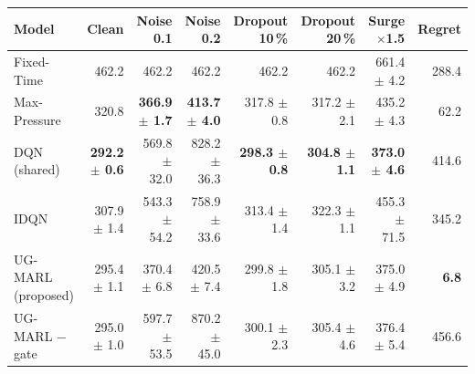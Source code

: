 \begin{tabular}{lrrrrrrr}
\toprule
Model & Clean & Noise 0.1 & Noise 0.2 & Dropout 10\,\% & Dropout 20\,\% & Surge $\times$1.5 & Regret \\
\midrule
Fixed-Time & 462.2 & 462.2 & 462.2 & 462.2 & 462.2 & 661.4 $\pm$ 4.2 & 288.4 \\
Max-Pressure & 320.8 & \textbf{366.9 $\pm$ 1.7} & \textbf{413.7 $\pm$ 4.0} & 317.8 $\pm$ 0.8 & 317.2 $\pm$ 2.1 & 435.2 $\pm$ 4.3 & 62.2 \\
DQN (shared) & \textbf{292.2 $\pm$ 0.6} & 569.8 $\pm$ 32.0 & 828.2 $\pm$ 36.3 & \textbf{298.3 $\pm$ 0.8} & \textbf{304.8 $\pm$ 1.1} & \textbf{373.0 $\pm$ 4.6} & 414.6 \\
IDQN & 307.9 $\pm$ 1.4 & 543.3 $\pm$ 54.2 & 758.9 $\pm$ 33.6 & 313.4 $\pm$ 1.4 & 322.3 $\pm$ 1.1 & 455.3 $\pm$ 71.5 & 345.2 \\
UG-MARL (proposed) & 295.4 $\pm$ 1.1 & 370.4 $\pm$ 6.8 & 420.5 $\pm$ 7.4 & 299.8 $\pm$ 1.8 & 305.1 $\pm$ 3.2 & 375.0 $\pm$ 4.9 & \textbf{6.8} \\
\midrule
UG-MARL $-$gate & 295.0 $\pm$ 1.0 & 597.7 $\pm$ 53.5 & 870.2 $\pm$ 45.0 & 300.1 $\pm$ 2.3 & 305.4 $\pm$ 4.6 & 376.4 $\pm$ 5.4 & 456.6 \\
\bottomrule
\end{tabular}
